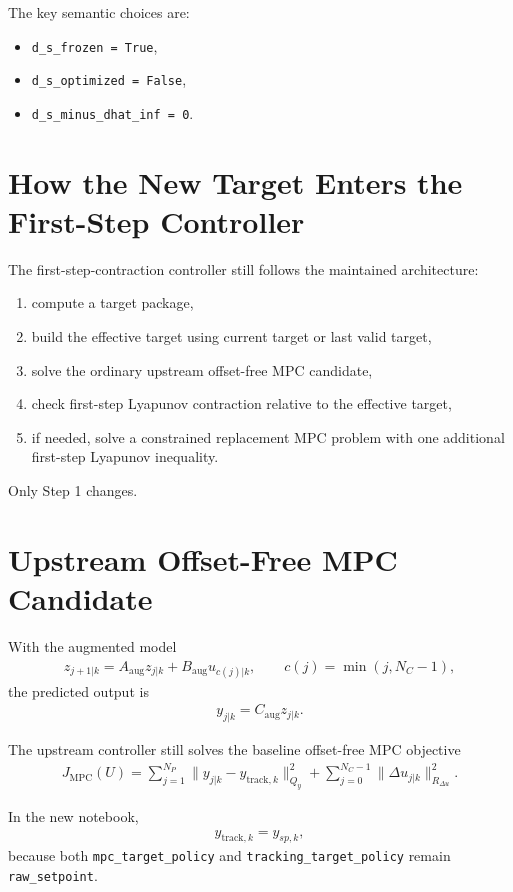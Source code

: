 \documentclass[11pt]{article}
\begin{document}
The key semantic choices are:
\begin{itemize}
\item \texttt{d\_s\_frozen = True},
\item \texttt{d\_s\_optimized = False},
\item \texttt{d\_s\_minus\_dhat\_inf = 0}.
\end{itemize}

\section{How the New Target Enters the First-Step Controller}

The first-step-contraction controller still follows the maintained architecture:
\begin{enumerate}
\item compute a target package,
\item build the effective target using current target or last valid target,
\item solve the ordinary upstream offset-free MPC candidate,
\item check first-step Lyapunov contraction relative to the effective target,
\item if needed, solve a constrained replacement MPC problem with one additional first-step Lyapunov inequality.
\end{enumerate}

Only Step 1 changes.

\section{Upstream Offset-Free MPC Candidate}

With the augmented model
\begin{align}
z_{j+1|k} = A_{\mathrm{aug}} z_{j|k} + B_{\mathrm{aug}} u_{c(j)|k},
\qquad
c(j)=\min(j,N_C-1),
\end{align}
the predicted output is
\begin{align}
y_{j|k} = C_{\mathrm{aug}} z_{j|k}.
\end{align}

The upstream controller still solves the baseline offset-free MPC objective
\begin{align}
J_{\mathrm{MPC}}(U)
=
\sum_{j=1}^{N_P}
\|y_{j|k} - y_{\mathrm{track},k}\|_{Q_y}^2
+
\sum_{j=0}^{N_C-1}
\|\Delta u_{j|k}\|_{R_{\Delta u}}^2.
\end{align}

In the new notebook,
\begin{align}
y_{\mathrm{track},k} = y_{sp,k},
\end{align}
because both
\texttt{mpc\_target\_policy} and
\texttt{tracking\_target\_policy}
remain \texttt{raw\_setpoint}.
\end{document}

